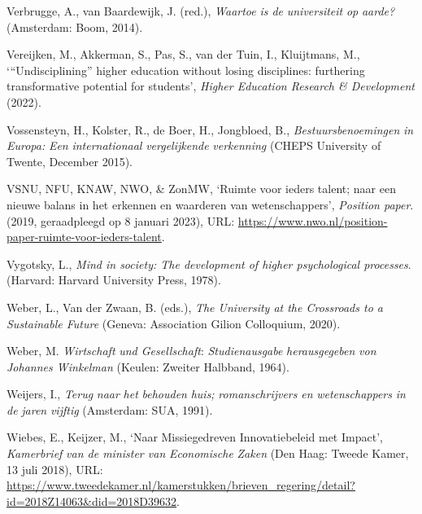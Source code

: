 \documentclass[smallauthor, chapterhaspagenum, nochapterinheader, pagenuminheader,  bigchapnum,medium2, tocpages, garamond, titleinheader]{jote-book}
\begin{document}
\begin{references}
		Verbrugge, A., van Baardewijk, J. (red.), \emph{Waartoe}\emph{ is de }\emph{universiteit}\emph{ op }\emph{aarde}\emph{?} (Amsterdam: Boom, 2014).



		Vereijken, M., Akkerman, S., Pas, S., van der Tuin, I., Kluijtmans, M., ‘“Undisciplining” higher education without losing disciplines: furthering transformative potential for students', \emph{Higher Education Research \& Development} (2022).



		Vossensteyn, H., Kolster, R., de Boer, H., Jongbloed, B., \emph{Bestuursbenoemingen}\emph{ in Europa: }\emph{Een}\emph{ }\emph{internationaal}\emph{ }\emph{vergelijkende}\emph{ }\emph{verkenning} (CHEPS University of Twente, December 2015).



		VSNU, NFU, KNAW, NWO, \& ZonMW, ‘Ruimte voor ieders talent; naar een nieuwe balans in het erkennen en waarderen van wetenschappers', \emph{Position paper}. (2019, geraadpleegd op 8 januari 2023), URL: \href{https://www.nwo.nl/position-paper-ruimte-voor-ieders-talent}{https://www.nwo.nl/position-paper-ruimte-voor-ieders-talent}.



		Vygotsky, L., \emph{Mind in society: The development of higher psychological processes}. (Harvard: Harvard University Press, 1978).



		Weber, L., Van der Zwaan, B. (eds.), \emph{The University at the Crossroads to a Sustainable Future} (Geneva: Association Gilion Colloquium, 2020).



		Weber, M. \emph{Wirtschaft}\emph{ und Gesellschaft}: \emph{Studienausgabe}\emph{ }\emph{herausgegeben}\emph{ von Johannes Winkelman}\emph{ }(Keulen: Zweiter Halbband, 1964).



		Weijers, I., \emph{Terug}\emph{ }\emph{naar}\emph{ het }\emph{behouden}\emph{ huis; }\emph{romanschrijvers}\emph{ }\emph{en}\emph{ }\emph{wetenschappers}\emph{ in de }\emph{jaren}\emph{ }\emph{vijftig} (Amsterdam: SUA, 1991).



		Wiebes, E., Keijzer, M., ‘Naar Missiegedreven Innovatiebeleid met Impact', \emph{Kamerbrief}\emph{ van de minister van }\emph{Economische}\emph{ }\emph{Zaken} (Den Haag: Tweede Kamer, 13 juli 2018), URL: \href{https://www.tweedekamer.nl/kamerstukken/brieven_regering/detail?id=2018Z14063&amp;did=2018D39632}{https://www.tweedekamer.nl/kamerstukken/brieven\_regering/detail?id=2018Z14063\&did=2018D39632}.




\end{references}
\end{document}
